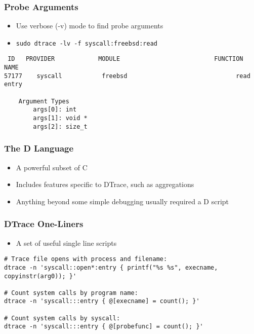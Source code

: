 \documentclass[pdftex]{beamer}
\begin{document}
\begin{frame}[fragile]
  \frametitle{Probe Arguments}
  \begin{itemize}
  \item Use verbose (-v) mode to find probe arguments
  \item \Verb+sudo dtrace -lv -f syscall:freebsd:read+
  \end{itemize}
\begin{verbatim}
 ID   PROVIDER            MODULE                          FUNCTION NAME
57177    syscall           freebsd                              read entry

	Argument Types
		args[0]: int
		args[1]: void *
		args[2]: size_t
\end{verbatim}
\end{frame}

\begin{frame}
  \frametitle{The D Language}
  \begin{itemize}
  \item A powerful subset of C
  \item Includes features specific to DTrace, such as aggregations
  \item Anything beyond some simple debugging usually required a D
    script
  \end{itemize}
\end{frame}

\begin{frame}[fragile]
  \frametitle{DTrace One-Liners}
  \begin{itemize}
  \item A set of useful single line scripts
  \end{itemize}
\begin{lstlisting}
# Trace file opens with process and filename:
dtrace -n 'syscall::open*:entry { printf("%s %s", execname, copyinstr(arg0)); }'

# Count system calls by program name:
dtrace -n 'syscall:::entry { @[execname] = count(); }'

# Count system calls by syscall:
dtrace -n 'syscall:::entry { @[probefunc] = count(); }'
\end{lstlisting}
\end{frame}
\end{document}
